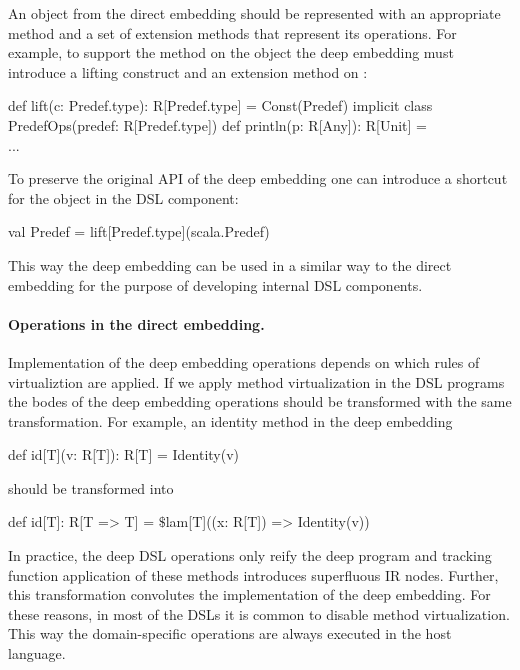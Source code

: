 An object from the direct embedding should be represented with an appropriate  method and a set
 of extension methods that represent its operations. For example, to support the 
 method on the  object the deep embedding must introduce a lifting construct and
 an extension method on :\begin{lstparagraph}
 def lift(c: Predef.type): R[Predef.type] = Const(Predef)
 implicit class PredefOps(predef: R[Predef.type]) {
   def println(p: R[Any]): R[Unit] = \\...
 }
 \end{lstparagraph}

To preserve the original API of the deep embedding one can introduce a shortcut for the
  object in the DSL component:\begin{lstparagraph}
 val Predef = lift[Predef.type](scala.Predef)
\end{lstparagraph}
This way the deep embedding can be used in a similar way to the direct embedding for
 the purpose of developing internal DSL components.


\paragraph{Operations in the direct embedding.} Implementation of the deep embedding operations
 depends on which rules of virtualiztion are applied. If we apply method virtualization
 in the DSL programs the bodes of the deep embedding operations should be transformed
 with the same transformation. For example, an identity method
 in the deep embedding\begin{lstparagraph}
   def id[T](v: R[T]): R[T] = Identity(v)
 \end{lstparagraph}
 should be transformed into\begin{lstparagraph}
   def id[T]: R[T => T] = $\$$lam[T]((x: R[T]) => Identity(v))
 \end{lstparagraph}

In practice, the deep DSL operations only reify the deep program and tracking function application of these
 methods introduces superfluous IR nodes. Further, this transformation convolutes
 the implementation of the deep embedding. For these reasons, in most of the DSLs it is common to disable method
 virtualization. This way the domain-specific operations are always executed in
 the host language.


